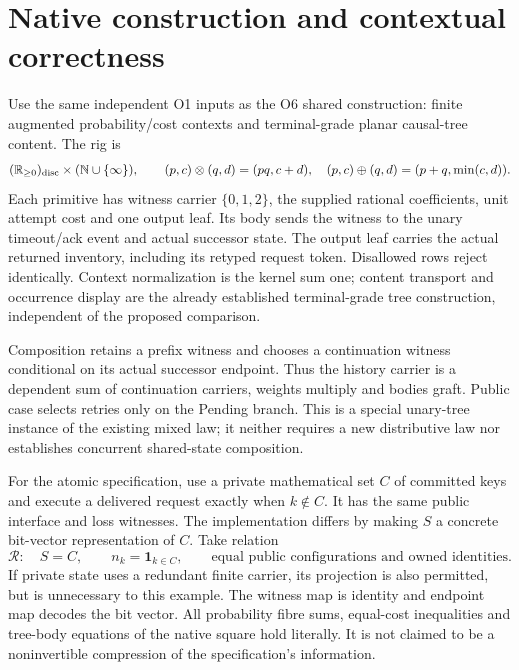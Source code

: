 \documentclass[11pt]{article}
\begin{document}
\section{Native construction and contextual correctness}
Use the same independent O1 inputs as the O6 shared construction: finite augmented probability/cost contexts and terminal-grade planar causal-tree content. The rig is
\[
(\mathbb R_{\ge0})_{\rm disc}\times(\mathbb N\cup\{\infty\}),
\qquad(p,c)\otimes(q,d)=(pq,c+d),
\quad(p,c)\oplus(q,d)=(p+q,\min(c,d)).
\]
Each primitive has witness carrier $\{0,1,2\}$, the supplied rational coefficients, unit attempt cost and one output leaf. Its body sends the witness to the unary timeout/ack event and actual successor state. The output leaf carries the actual returned inventory, including its retyped request token. Disallowed rows reject identically. Context normalization is the kernel sum one; content transport and occurrence display are the already established terminal-grade tree construction, independent of the proposed comparison.

Composition retains a prefix witness and chooses a continuation witness conditional on its actual successor endpoint. Thus the history carrier is a dependent sum of continuation carriers, weights multiply and bodies graft. Public case selects retries only on the Pending branch. This is a special unary-tree instance of the existing mixed law; it neither requires a new distributive law nor establishes concurrent shared-state composition.

For the atomic specification, use a private mathematical set $C$ of committed keys and execute a delivered request exactly when $k\notin C$. It has the same public interface and loss witnesses. The implementation differs by making $S$ a concrete bit-vector representation of $C$. Take relation
\[
\mathcal R:\quad S=C,\qquad n_k=\mathbf 1_{k\in C},
\qquad\text{equal public configurations and owned identities}.
\]
If private state uses a redundant finite carrier, its projection is also permitted, but is unnecessary to this example. The witness map is identity and endpoint map decodes the bit vector. All probability fibre sums, equal-cost inequalities and tree-body equations of the native square hold literally. It is not claimed to be a noninvertible compression of the specification's information.
\end{document}
